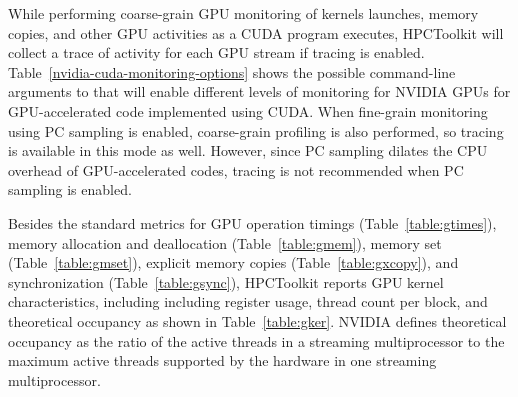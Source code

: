 While performing coarse-grain GPU monitoring of kernels launches, memory copies, and other GPU activities as a CUDA program executes, HPCToolkit will collect a trace of activity for each GPU stream if tracing is enabled. Table~\ref{nvidia-cuda-monitoring-options} shows the possible command-line arguments to \hpcrun{} that will enable different levels of monitoring  for NVIDIA GPUs for GPU-accelerated code implemented using CUDA. When fine-grain monitoring using PC sampling is enabled, coarse-grain profiling is also performed, so tracing is available in this mode as well. However, since PC sampling dilates the CPU overhead of GPU-accelerated codes, tracing is not recommended when PC sampling is enabled.

Besides the standard metrics for GPU operation timings (Table~\ref{table:gtimes}), memory allocation and deallocation (Table~\ref{table:gmem}), memory set (Table~\ref{table:gmset}), explicit memory copies (Table~\ref{table:gxcopy}), and synchronization (Table~\ref{table:gsync}), HPCToolkit reports GPU kernel characteristics, including including register usage,  thread count per block, and theoretical occupancy as shown in Table~\ref{table:gker}. NVIDIA defines theoretical occupancy as the ratio of the active threads in a streaming multiprocessor to the maximum active threads supported by the hardware in one streaming multiprocessor.





